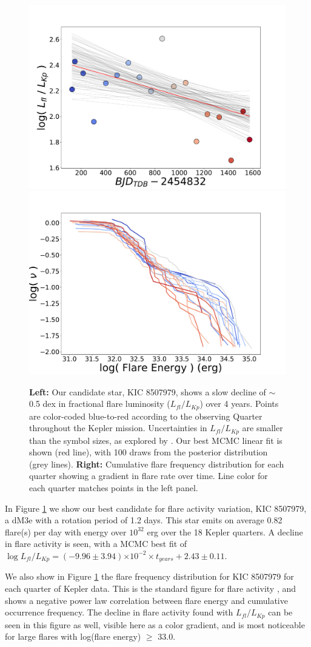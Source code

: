 \documentclass[RNAAS, modern]{aastex62}
\providecommand{\e}[1]{\ensuremath{\times 10^{#1}}}
\begin{document}
\begin{figure}
\includegraphics[width=.49\textwidth]{008507979_frac_lum.pdf}
\includegraphics[width=.49\textwidth]{008507979_evf.pdf}
\caption{
{\bf Left:} Our candidate star, KIC 8507979, shows a slow decline of $\sim$0.5 dex in fractional flare luminosity ($L_{fl}/L_{Kp}$) over 4 years. Points are color-coded blue-to-red according to the observing Quarter throughout the Kepler mission. Uncertainties in $L_{fl}/L_{Kp}$ are smaller than the symbol sizes, as explored by \citet{lurie2015}. Our best MCMC linear fit is shown (red line), with 100 draws from the posterior distribution (grey lines).
{\bf Right:} Cumulative flare frequency distribution for each quarter showing a gradient in flare rate over time. Line color for each quarter matches points in the left panel.
}
\label{fig1}
\end{figure}


In Figure \ref{fig1} we show our best candidate for flare activity variation, KIC 8507979, a dM3e with a rotation period of 1.2 days. This star emits on average 0.82 flare(s) per day with energy over $10^{32}$ erg over the 18 Kepler quarters. A decline in flare activity is seen, with a MCMC best fit of 
 $\log L_{fl}/L_{Kp} =(-9.96\pm3.94)\e{-2} \times t_{years} + 2.43\pm0.11$.



We also show in Figure \ref{fig1} the flare frequency distribution for KIC 8507979 for each quarter of Kepler data. This is the standard figure for flare activity \citep[e.g.][]{lme1976,davenport2019}, and shows a negative power law correlation between flare energy and cumulative occurrence frequency. The decline in flare activity found with $L_{fl}/L_{Kp}$ can be seen in this figure as well, visible here as a color gradient, and is most noticeable for large flares with log(flare energy) $\geq$ 33.0.
\end{document}
